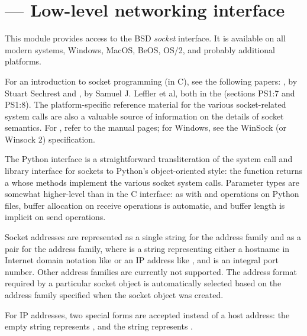 \section{ ---
         Low-level networking interface}



This module provides access to the BSD \emph{socket} interface.
It is available on all modern \UNIX{} systems, Windows, MacOS, BeOS,
OS/2, and probably additional platforms.

For an introduction to socket programming (in C), see the following
papers: , by Stuart Sechrest and , by Samuel J.  Leffler et al,
both in the 
(sections PS1:7 and PS1:8).  The platform-specific reference material
for the various socket-related system calls are also a valuable source
of information on the details of socket semantics.  For \UNIX, refer
to the manual pages; for Windows, see the WinSock (or Winsock 2)
specification.

The Python interface is a straightforward transliteration of the
\UNIX{} system call and library interface for sockets to Python's
object-oriented style: the  function returns a
 whose methods implement the
various socket system calls.  Parameter types are somewhat
higher-level than in the C interface: as with  and
 operations on Python files, buffer allocation on
receive operations is automatic, and buffer length is implicit on send
operations.

Socket addresses are represented as a single string for the
 address family and as a pair
 for the  address
family, where  is a string representing
either a hostname in Internet domain notation like
 or an IP address like ,
and  is an integral port number.  Other address families are
currently not supported.  The address format required by a particular
socket object is automatically selected based on the address family
specified when the socket object was created.

For IP addresses, two special forms are accepted instead of a host
address: the empty string represents , and the string
 represents .


